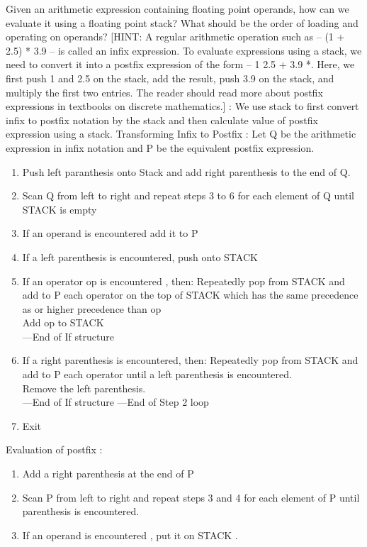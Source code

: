 \begin{ExerciseList}
\Exercise[difficulty=2]
Given an arithmetic expression containing floating point operands, how can we evaluate it using a floating point
stack? What should be the order of loading and operating on operands? 
[HINT: A regular arithmetic operation such as -- (1 + 2.5) * 3.9 -- is called an infix expression. To evaluate
expressions using a stack, we need to convert it into a postfix expression of the form -- 1 2.5 + 3.9 *. Here,
we first push 1 and 2.5 on the stack, add the result, push 3.9 on the stack, and multiply the first two entries.
The reader should read more about postfix expressions in textbooks on discrete mathematics.]
\Answer :
We use stack to first convert infix to postfix notation by the stack and then calculate value of postfix expression using a stack.
Transforming Infix to Postfix :
Let Q be the arithmetic expression in infix notation and  P be the equivalent postfix expression.
\begin{enumerate}
\item Push left paranthesis onto Stack and add right parenthesis to the end of Q.
\item Scan Q from left to right and repeat steps 3 to 6 for each element of Q until STACK is empty
\item If an operand is encountered add it to P
\item If a left parenthesis is encountered, push onto STACK
\item If an operator op is encountered , then:
     Repeatedly pop from STACK and add to P each operator on the top of STACK which has the same precedence as or higher precedence than op\\
     Add op to STACK\\
---End of If structure
\item If a right parenthesis is encountered, then:
Repeatedly pop from STACK and add to P each operator until a left parenthesis is encountered.\\
Remove the left parenthesis.\\
---End of If structure
---End of Step 2 loop
\item Exit
\end{enumerate}
Evaluation of postfix :
\begin {enumerate}
\item Add a right parenthesis at the end of P
\item Scan P from left to right and repeat steps 3 and 4 for each element of P until parenthesis is encountered.
\item If an operand is encountered , put it on STACK .

\end{enumerate}
\end{ExerciseList}

